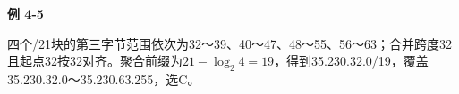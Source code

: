 {\color{ink}\bfseries 例 4-5}\par\vspace{1bp}四个/\allowbreak{}21块的第三字节范围依次为32～39、40～47、48～55、56～63；合并跨度32且起点32按32对齐。聚合前缀为\(21-\operatorname{log}_{2}4=\allowbreak{}19\)，得到35.230.32.0/\allowbreak{}19，覆盖35.230.32.0～35.230.63.255，选C。

